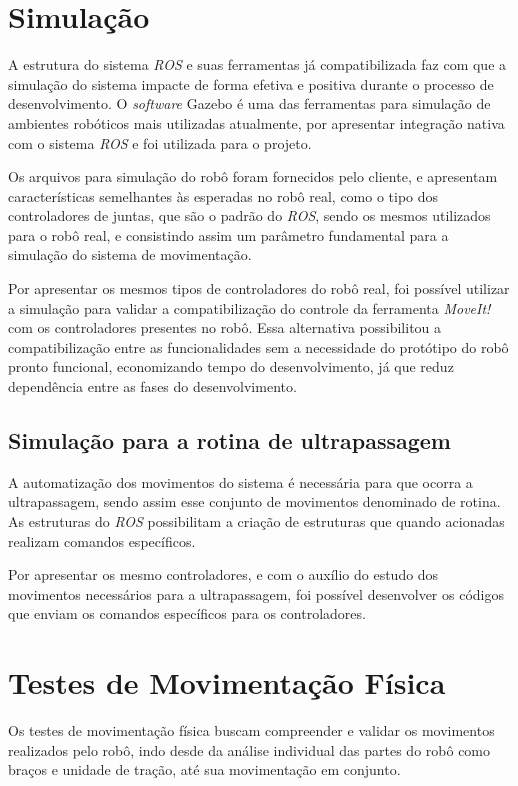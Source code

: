 \section{Simulação}\label{sec:simul_result}
A estrutura do sistema \textit{ROS} e suas ferramentas já compatibilizada faz com que a simulação do sistema impacte de forma efetiva e positiva durante o processo de desenvolvimento. O \textit{software} Gazebo é uma das ferramentas para simulação  de ambientes robóticos mais utilizadas atualmente, por apresentar integração nativa com o sistema \textit{ROS} e foi utilizada para o projeto.

Os arquivos para  simulação do robô foram fornecidos pelo cliente, e apresentam características semelhantes às esperadas no robô real, como o tipo dos controladores de juntas, que são o padrão do \textit{ROS}, sendo os mesmos utilizados para o robô real, e consistindo assim um parâmetro fundamental para a simulação do sistema de movimentação.

Por apresentar os mesmos tipos de controladores do robô real, foi possível utilizar a simulação para validar a compatibilização do controle da ferramenta \textit{MoveIt!} com os controladores presentes no robô. Essa alternativa possibilitou a compatibilização entre as funcionalidades sem a necessidade do protótipo do robô pronto funcional, economizando tempo do desenvolvimento, já que reduz dependência entre as fases do desenvolvimento.

\subsection{Simulação para a rotina de ultrapassagem}\label{sec:simu_ultr}
A automatização dos movimentos do sistema é necessária para que ocorra a ultrapassagem, sendo assim esse conjunto de movimentos denominado de rotina. As estruturas do \textit{ROS} possibilitam a criação de estruturas que quando acionadas realizam comandos específicos.

Por apresentar os mesmo controladores, e com o auxílio do estudo dos movimentos necessários para a ultrapassagem, foi possível desenvolver os códigos que enviam os comandos específicos para os controladores.


\section{Testes de Movimentação Física}\label{sec:test_mov}
Os testes de movimentação física buscam compreender e validar os movimentos realizados pelo robô, indo desde da análise individual das partes do robô como braços e unidade de tração, até sua movimentação em conjunto.

